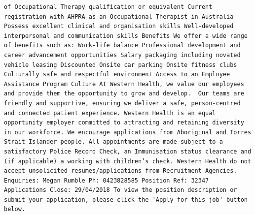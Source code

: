 \documentclass[11pt,a4paper,]{article}
\begin{document}
\begin{verbatim}
of Occupational Therapy qualification or equivalent Current registration with AHPRA as an Occupational Therapist in Australia Possess excellent clinical and organisation skills Well-developed interpersonal and communication skills Benefits We offer a wide range of benefits such as: Work-life balance Professional development and career advancement opportunities Salary packaging including novated vehicle leasing Discounted Onsite car parking Onsite fitness clubs Culturally safe and respectful environment Access to an Employee Assistance Program Culture At Western Health, we value our employees and provide them the opportunity to grow and develop.  Our teams are friendly and supportive, ensuring we deliver a safe, person-centred and connected patient experience. Western Health is an equal opportunity employer committed to attracting and retaining diversity in our workforce. We encourage applications from Aboriginal and Torres Strait Islander people. All appointments are made subject to a satisfactory Police Record Check, an Immunisation status clearance and (if applicable) a working with children’s check. Western Health do not accept unsolicited resumes/applications from Recruitment Agencies. Enquiries: Megan Rumble Ph: 0423828585 Position Ref: 32347 Applications Close: 29/04/2018 To view the position description or submit your application, please click the 'Apply for this job' button below.

\end{verbatim}
\end{document}
